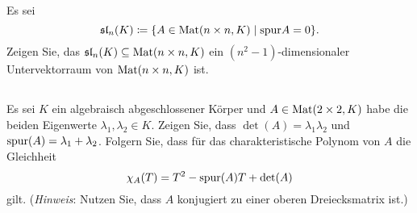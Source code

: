 \documentclass[a4paper,9pt]{extarticle}
\begin{document}
\subsection{}
Es sei
\[
 \mathfrak{sl}_n(K) \coloneqq \{A \in \mathrm{Mat}(n \times n, K) \mid \mathrm{spur} A = 0\}.
\]
Zeigen Sie, das $\mathfrak{sl}_n(K) \subseteq \mathrm{Mat}(n \times n, K)$ ein $(n^2-1)$-dimensionaler Untervektorraum von $\mathrm{Mat}(n \times n, K)$ ist.

\subsection{}
Es sei $K$ ein algebraisch abgeschlossener Körper und $A \in \mathrm{Mat}(2 \times 2, K)$ habe die beiden Eigenwerte $\lambda_1, \lambda_2 \in K$. Zeigen Sie, dass $\det(A) = \lambda_1 \lambda_2$ und $\mathrm{spur}(A) = \lambda_1 + \lambda_2$. Folgern Sie, dass für das charakteristische Polynom von $A$ die Gleichheit
\[
 \chi_A(T) = T^2 - \mathrm{spur}(A) T + \det(A)
\]
gilt. (\emph{Hinweis}: Nutzen Sie, dass $A$ konjugiert zu einer oberen Dreiecksmatrix ist.)
\end{document}

